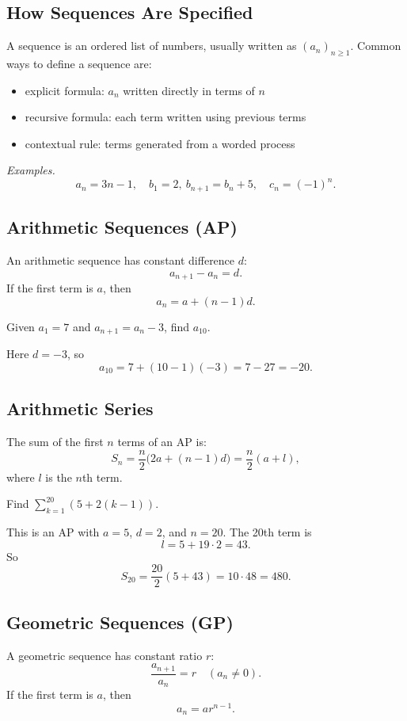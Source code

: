 \subsection{How Sequences Are Specified}
A sequence is an ordered list of numbers, usually written as $(a_n)_{n\ge 1}$.
Common ways to define a sequence are:
\begin{itemize}[leftmargin=*]
  \item explicit formula: $a_n$ written directly in terms of $n$
  \item recursive formula: each term written using previous terms
  \item contextual rule: terms generated from a worded process
\end{itemize}

\textit{Examples.}
\[
a_n = 3n-1,\quad b_1=2,\ b_{n+1}=b_n+5,\quad c_n = (-1)^n.
\]

\subsection{Arithmetic Sequences (AP)}
An arithmetic sequence has constant difference $d$:
\[
a_{n+1}-a_n=d.
\]
If the first term is $a$, then
\[
a_n = a + (n-1)d.
\]

\begin{problem}[Recognizing an AP]
Given $a_1=7$ and $a_{n+1}=a_n-3$, find $a_{10}$.
\end{problem}
\begin{solution}
Here $d=-3$, so
\[
a_{10}=7+(10-1)(-3)=7-27=-20.
\]
\end{solution}

\subsection{Arithmetic Series}
The sum of the first $n$ terms of an AP is:
\[
S_n = \frac{n}{2}\bigl(2a+(n-1)d\bigr)=\frac{n}{2}(a+l),
\]
where $l$ is the $n$th term.

\begin{problem}[AP Sum]
Find $\sum_{k=1}^{20}(5+2(k-1))$.
\end{problem}
\begin{solution}
This is an AP with $a=5$, $d=2$, and $n=20$. The 20th term is
\[
l=5+19\cdot 2=43.
\]
So
\[
S_{20}=\frac{20}{2}(5+43)=10\cdot 48=480.
\]
\end{solution}

\subsection{Geometric Sequences (GP)}
A geometric sequence has constant ratio $r$:
\[
\frac{a_{n+1}}{a_n}=r \quad (a_n\ne 0).
\]
If the first term is $a$, then
\[
a_n = ar^{n-1}.
\]

